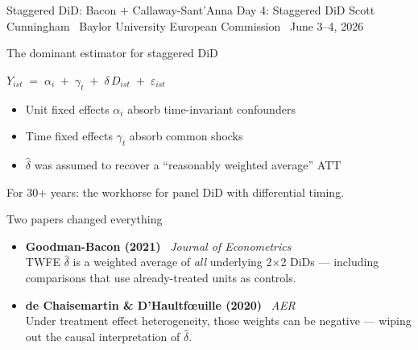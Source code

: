 \documentclass[aspectratio=169,11pt]{beamer}
\begin{document}

\codechellatitle
  {Staggered DiD: Bacon $+$ Callaway-Sant'Anna}
  {Day 4: Staggered DiD}
  {Scott Cunningham \textperiodcentered\ Baylor University}
  {European Commission \textperiodcentered\ June 3--4, 2026}

\begin{frame}{The dominant estimator for staggered DiD}
\vspace{0.6em}
\begin{center}
\large
$Y_{ist} \;=\; \alpha_i \;+\; \gamma_t \;+\; \delta\, D_{ist} \;+\; \varepsilon_{ist}$
\end{center}
\vspace{0.8em}
\begin{itemize}\setlength\itemsep{0.5em}
  \item Unit fixed effects $\alpha_i$ absorb time-invariant confounders
  \item Time fixed effects $\gamma_t$ absorb common shocks
  \item $\hat\delta$ was assumed to recover a ``reasonably weighted average'' ATT
\end{itemize}
\vspace{0.5em}
\begin{center}\color{warmgray}\small
For 30+ years: the workhorse for panel DiD with differential timing.
\end{center}
\end{frame}

\begin{frame}{Two papers changed everything}
\vspace{0.8em}
\begin{itemize}\setlength\itemsep{0.7em}
  \item \textbf{Goodman-Bacon (2021)} \textperiodcentered\ \textit{Journal of Econometrics}\\
        {\small\color{warmgray} TWFE $\hat\delta$ is a weighted average of \textit{all} underlying 2$\times$2 DiDs --- including comparisons that use already-treated units as controls.}

  \item \textbf{de Chaisemartin \& D'Haultf\oe{}uille (2020)} \textperiodcentered\ \textit{AER}\\
        {\small\color{warmgray} Under treatment effect heterogeneity, those weights can be negative --- wiping out the causal interpretation of $\hat\delta$.}
\end{itemize}
\vspace{0.7em}
\begin{center}
\end{center}
\end{frame}
\end{document}
